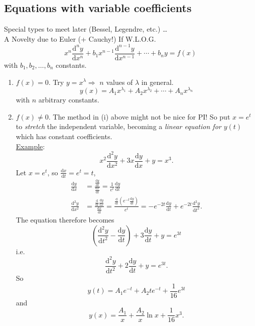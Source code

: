 \documentclass[12pt]{report}
\theoremstyle{definition}
\begin{document}
\subsection{Equations with variable coefficients}

Special types to meet later (Bessel, Legendre, etc.) \ldots
\smallskip
\\A Novelty due to Euler (+ Cauchy!) If W.L.O.G.\[
    x^{n} \frac{\mathrm{d}^{n}y}{\mathrm{d}x^{n}} + b_1 x^{n-1}\frac{\mathrm{d}^{n-1}y}{\mathrm{d}x^{n-1}} 
    + \cdots + b_n y = f(x)
\]with $b_1, b_2, \ldots, b_n$ constants.
\begin{enumerate}[label = (\roman*)]
    \item $f(x) = 0$. Try $y = x^{\lambda} \Rightarrow{}$ $n$ values of $\lambda$ in general.\[
            y(x) = A_1 x^{\lambda_1} + A_2 x^{\lambda_2} + \cdots + A_n x^{\lambda_n}
    \]with $n$ arbitrary constants.
    
\item $f(x) \neq 0$. The method in (i) above might not be nice for PI!\@
    So put $x = e^{t}$ to \emph{stretch} the independent variable, becoming
    a \emph{linear equation for $y(t)$} which has constant coefficients.
    \smallskip
    \\\underline{Example}:\[
        x^{2}\frac{\mathrm{d}^{2}y}{\mathrm{d}x^{2}} + 3x\frac{\mathrm{d}y}{\mathrm{d}x} + y = x^{3}.
    \]Let $x = e^{t}$, so $\frac{\mathrm{d}x}{\mathrm{d}t} = e^{t} = t$,\[
        \begin{align*}
            \frac{\mathrm{d}y}{\mathrm{d}x} & = \frac{\frac{\mathrm{d}y}{\mathrm{d}t} }{\frac{\mathrm{d}x}{\mathrm{d}t} }
            = \frac{1}{e^{t}} \frac{\mathrm{d}y}{\mathrm{d}t} \\
            \frac{\mathrm{d}^{2}y}{\mathrm{d}x^{2}} & =
            \frac{\frac{\mathrm{d}}{\mathrm{d}t} \frac{\mathrm{d}y}{\mathrm{d}x} }{\frac{\mathrm{d}x}{\mathrm{d}t}}
            = \frac{\frac{\mathrm{d}}{\mathrm{d}t} \left(e^{-t} \frac{\mathrm{d}y}{\mathrm{d}t} \right)} {e^{t}}
            = -e^{-2t}\frac{\mathrm{d}y}{\mathrm{d}t} + e^{-2t}\frac{\mathrm{d}^{2}y}{\mathrm{d}t^{2}}.
        \end{align*}
    \]The equation therefore becomes\[
    \left(\frac{\mathrm{d}^{2}y}{\mathrm{d}t^{2}} - \frac{\mathrm{d}y}{\mathrm{d}t} \right) 
    + 3\frac{\mathrm{d}y}{\mathrm{d}t} + y = e^{3t}
    \]i.e.\[
        \frac{\mathrm{d}^{2}y}{\mathrm{d}t^{2}} + 2\frac{\mathrm{d}y}{\mathrm{d}t} + y = e^{3t}.
    \]So\[
    y(t) = A_1 e^{-t} + A_2 t e^{-t} + \frac{1}{16}e^{3t}
    \]and\[
    y(x) = \frac{A_1}{x} + \frac{A_2}{x}\ln{x} + \frac{1}{16}x^{3}.
    \]
\end{enumerate}
\end{document}
